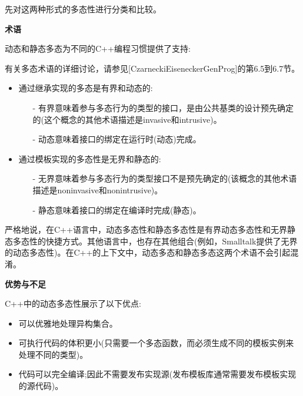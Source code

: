 
先对这两种形式的多态性进行分类和比较。

\noindent
\textbf{术语}

动态和静态多态为不同的C++编程习惯提供了支持:

\begin{tcolorbox}[colback=webgreen!5!white,colframe=webgreen!75!black]
\hspace*{0.75cm}有关多态术语的详细讨论，请参见[CzarneckiEiseneckerGenProg]的第6.5到6.7节。
\end{tcolorbox}

\begin{itemize}
\item 
通过继承实现的多态是有界和动态的:

\begin{itemize}
\item[-]
有界意味着参与多态行为的类型的接口，是由公共基类的设计预先确定的(这个概念的其他术语描述是invasive和intrusive)。

\item[-]
动态意味着接口的绑定在运行时(动态)完成。
\end{itemize}

\item 
通过模板实现的多态性是无界和静态的:

\begin{itemize}
\item[-]
无界意味着参与多态行为的类型接口不是预先确定的(该概念的其他术语描述是noninvasive和nonintrusive)。

\item[-]
静态意味着接口的绑定在编译时完成(静态)。
\end{itemize}
\end{itemize}

严格地说，在C++语言中，动态多态性和静态多态性是有界动态多态性和无界静态多态性的快捷方式。其他语言中，也存在其他组合(例如，Smalltalk提供了无界的动态多态性)。在C++的上下文中，动态多态和静态多态这两个术语不会引起混淆。

\noindent
\textbf{优势与不足}

C++中的动态多态性展示了以下优点:

\begin{itemize}
\item 
可以优雅地处理异构集合。

\item 
可执行代码的体积更小(只需要一个多态函数，而必须生成不同的模板实例来处理不同的类型)。

\item 
代码可以完全编译;因此不需要发布实现源(发布模板库通常需要发布模板实现的源代码)。
\end{itemize}

